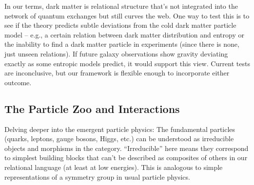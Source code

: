 \documentclass{article}
\begin{document}
\begin{description}
In our terms, dark matter is relational structure that’s not integrated into the network of quantum exchanges but still curves the web. One way to test this is to see if the theory predicts subtle deviations from the cold dark matter particle model – e.g., a certain relation between dark matter distribution and entropy or the inability to find a dark matter particle in experiments (since there is none, just unseen relations). If future galaxy observations show gravity deviating exactly as some entropic models predict, it would support this view. Current tests are inconclusive\cite{verlinde2016}, but our framework is flexible enough to incorporate either outcome.
\end{description}

\subsection{The Particle Zoo and Interactions}

Delving deeper into the emergent particle physics: The fundamental particles (quarks, leptons, gauge bosons, Higgs, etc.) can be understood as irreducible objects and morphisms in the category. “Irreducible” here means they correspond to simplest building blocks that can’t be described as composites of others in our relational language (at least at low energies). This is analogous to simple representations of a symmetry group in usual particle physics.
\end{document}
